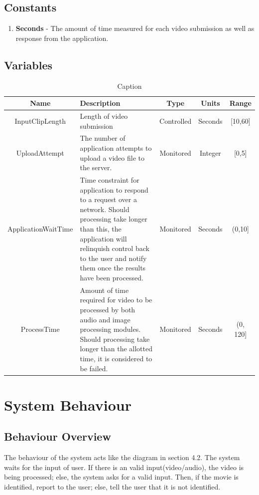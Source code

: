 \documentclass[titlepage]{article}
\begin{document}
\subsection{Constants}
\begin{enumerate}
    \item \textbf{Seconds} - The amount of time measured for each video submission as well as response from the application.
\end{enumerate}

\subsection{Variables}
\begin{table}[H]
    \centering
    \begin{tabularx}{\textwidth}{|c|X|c|c|c|}
        \hline
        \textbf{Name} & \textbf{Description} & \textbf{Type} & \textbf{Units} & \textbf{Range}\\
        \hline
        InputClipLength & Length of video submission & Controlled & Seconds & [10,60] \\
        \hline
        UploadAttempt & The number of application attempts to upload a video file to the server. & Monitored & Integer & [0,5] \\
        \hline
        ApplicationWaitTime & Time constraint for application to respond to a request over a network. Should processing take longer than this, the application will relinquish control back to the user and notify them once the results have been processed. & Monitored & Seconds & (0,10] \\
        \hline
        ProcessTime & Amount of time required for video to be processed by both audio and image processing modules. Should processing take longer than the allotted time, it is considered to be failed. & Monitored & Seconds & (0, 120] \\
        \hline
    \end{tabularx}
    \caption{Caption}
    \label{tab:Variables}
\end{table}

\newpage
\section{System Behaviour}

\subsection{Behaviour Overview}
The behaviour of the system acts like the diagram in section 4.2. The system waits for the input of user. If there is an valid input(video/audio), the video is being processed; else, the system asks for a valid input. Then, if the movie is identified, report to the user; else, tell the user that it is not identified.
\end{document}
